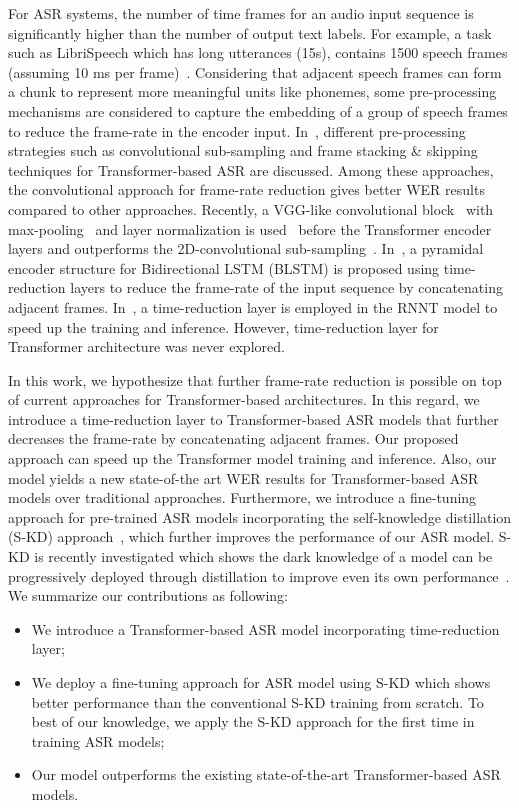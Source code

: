 \documentclass{article}
\begin{document}
For ASR systems, the number of time frames for an audio input sequence is significantly higher than the number of output text labels. For example, a task such as LibriSpeech which has long utterances (15s), contains 1500 speech frames (assuming 10 ms per frame)~\citep{irie2019}. Considering that adjacent speech frames can form a chunk to represent more meaningful units like phonemes, some pre-processing mechanisms are considered to capture the embedding of a group of speech frames to reduce the frame-rate in the encoder input.  In~\citep{wang2020b}, different pre-processing strategies such as convolutional sub-sampling and frame stacking \& skipping techniques for Transformer-based ASR are discussed. Among these approaches, the convolutional approach for frame-rate reduction gives better WER results compared to other approaches. Recently, a VGG-like convolutional block~\citep{vgg2017} with max-pooling~\citep{hori2017} and layer normalization is used~\citep{wang2020a} before the Transformer encoder layers and outperforms the 2D-convolutional  sub-sampling~\citep{karita2019asru}. In~\citep{chan2016listen}, a pyramidal encoder structure for Bidirectional LSTM (BLSTM) is proposed using time-reduction layers to reduce the frame-rate of the input sequence by concatenating adjacent frames. In~\citep{He2018}, a time-reduction layer is employed in the RNNT model to speed up the training and inference. However, time-reduction layer for Transformer architecture was never explored.   



In this work, we hypothesize that further frame-rate reduction is possible on top of current approaches for Transformer-based architectures. In this regard, we introduce a time-reduction layer to Transformer-based ASR models that further decreases the frame-rate by concatenating adjacent frames.
Our proposed approach can speed up the Transformer model training and inference. Also, our model yields a new state-of-the art WER results for  Transformer-based ASR models over traditional approaches.  
Furthermore, we introduce a fine-tuning approach for pre-trained ASR  models incorporating the self-knowledge distillation (S-KD) approach~\citep{selfkdgeneralization,selfkdnlp}, which further improves the performance of our ASR model. S-KD is recently investigated which shows the dark knowledge of a model can be progressively deployed through distillation to improve even its own  performance~\citep{selfkdgeneralization,selfkdnlp}.
We summarize our contributions as following:
\begin{itemize}
    \item We introduce a Transformer-based ASR model incorporating  time-reduction layer;
    \item We deploy a fine-tuning approach for ASR model using S-KD which shows better performance than the conventional S-KD training from scratch. To best of our knowledge, we apply the S-KD approach for the first time in training ASR models;
    \item Our model outperforms the existing state-of-the-art Transformer-based ASR models. 
\end{itemize}
\end{document}
